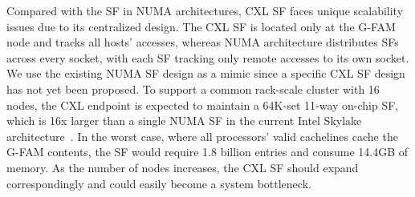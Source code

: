 






Compared with the SF in NUMA architectures, CXL SF faces unique scalability issues due to its centralized design. The CXL SF is located only at the G-FAM node and tracks all hosts' accesses, whereas NUMA architecture distributes SFs across every socket, with each SF tracking only remote accesses to its own socket.
We use the existing NUMA SF design as a mimic since a specific CXL SF design has not yet been proposed. To support a common rack-scale cluster with 16 nodes, the CXL endpoint is expected to maintain a 64K-set 11-way on-chip SF, which is 16x larger than a single NUMA SF in the current Intel Skylake architecture~\cite{directory_sp19, skylake_sf_doc}. In the worst case, where all processors' valid cachelines cache the G-FAM contents, the SF would require 1.8 billion entries and consume 14.4GB of memory. As the number of nodes increases, the CXL SF should expand correspondingly and could easily become a system bottleneck.


